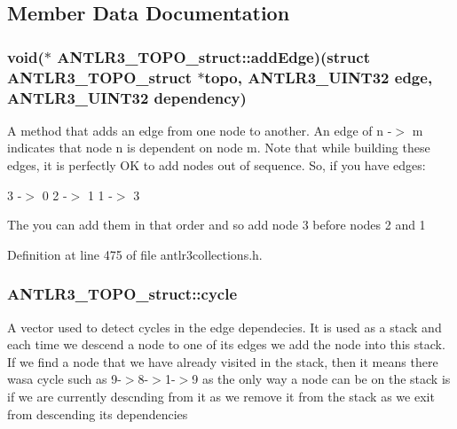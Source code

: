 \subsection{Member Data Documentation}
\hypertarget{struct_a_n_t_l_r3___t_o_p_o__struct_afb41f8a34a9fbbb281748fec3bb3a255}{
\subsubsection[{add\-Edge}]{\setlength{\rightskip}{0pt plus 5cm}void($\ast$ A\-N\-T\-L\-R3\-\_\-\-T\-O\-P\-O\-\_\-struct\-::add\-Edge)(struct {\bf A\-N\-T\-L\-R3\-\_\-\-T\-O\-P\-O\-\_\-struct} $\ast$topo, {\bf A\-N\-T\-L\-R3\-\_\-\-U\-I\-N\-T32} edge, {\bf A\-N\-T\-L\-R3\-\_\-\-U\-I\-N\-T32} dependency)}}\label{struct_a_n_t_l_r3___t_o_p_o__struct_afb41f8a34a9fbbb281748fec3bb3a255}
A method that adds an edge from one node to another. An edge of n -\/$>$ m indicates that node n is dependent on node m. Note that while building these edges, it is perfectly O\-K to add nodes out of sequence. So, if you have edges\-:

3 -\/$>$ 0 2 -\/$>$ 1 1 -\/$>$ 3

The you can add them in that order and so add node 3 before nodes 2 and 1 

Definition at line 475 of file antlr3collections.\-h.

\hypertarget{struct_a_n_t_l_r3___t_o_p_o__struct_a347e5faba5b581d7a40cb8e991a2a4d3}{
\subsubsection[{cycle}]{ A\-N\-T\-L\-R3\-\_\-\-T\-O\-P\-O\-\_\-struct\-::cycle}}\label{struct_a_n_t_l_r3___t_o_p_o__struct_a347e5faba5b581d7a40cb8e991a2a4d3}
A vector used to detect cycles in the edge dependecies. It is used as a stack and each time we descend a node to one of its edges we add the node into this stack. If we find a node that we have already visited in the stack, then it means there wasa cycle such as 9-\/$>$8-\/$>$1-\/$>$9 as the only way a node can be on the stack is if we are currently descnding from it as we remove it from the stack as we exit from descending its dependencies 

